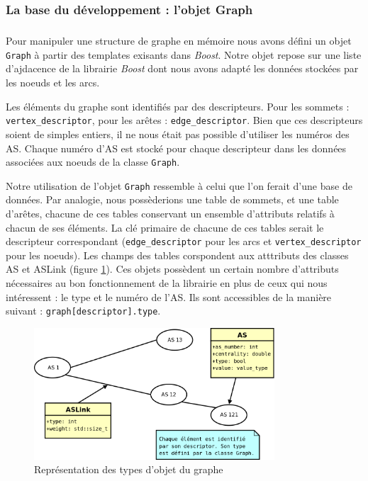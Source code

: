 \subsubsection{La base du développement : l'objet Graph}
\subparagraph{}
Pour manipuler une structure de graphe en mémoire nous avons défini un objet \verb|Graph| à partir des templates exisants dans \textit{Boost}. Notre objet repose sur une liste d'ajdacence de la librairie \textit{Boost} dont nous avons adapté les données stockées par les noeuds et les arcs.

Les éléments du graphe sont identifiés par des descripteurs. Pour les sommets : \verb|vertex_descriptor|, pour les arêtes : \verb|edge_descriptor|. Bien que ces descripteurs soient de simples entiers, il ne nous était pas possible d'utiliser les numéros des AS. Chaque numéro d'AS est stocké pour chaque descripteur dans les données associées aux noeuds de la classe \verb|Graph|. %

Notre utilisation de l'objet \verb|Graph| ressemble à celui que l'on ferait d'une base de données. Par analogie, nous possèderions une table de sommets, et une table d'arêtes, chacune de ces tables conservant un ensemble d'attributs relatifs à chacun de ses éléments. La clé primaire de chacune de ces tables serait le descripteur correspondant (\verb|edge_descriptor| pour les arcs et \verb|vertex_descriptor| pour les noeuds). Les champs des tables corspondent aux atttributs des classes AS et ASLink (figure \ref{bdd}).
Ces objets possèdent un certain nombre d'attributs nécessaires au bon fonctionnement de la librairie \boost en plus de ceux qui nous intéressent : le type et le numéro de l'AS. Ils sont accessibles de la manière suivant : \verb|graph[descriptor].type|.


\begin{figure}[H]
\begin{center}
        \includegraphics[width=0.8\textwidth]{./schema/bdd.png}
\caption{Représentation des types d'objet du graphe}
\label{bdd}
\end{center}
\end{figure}


